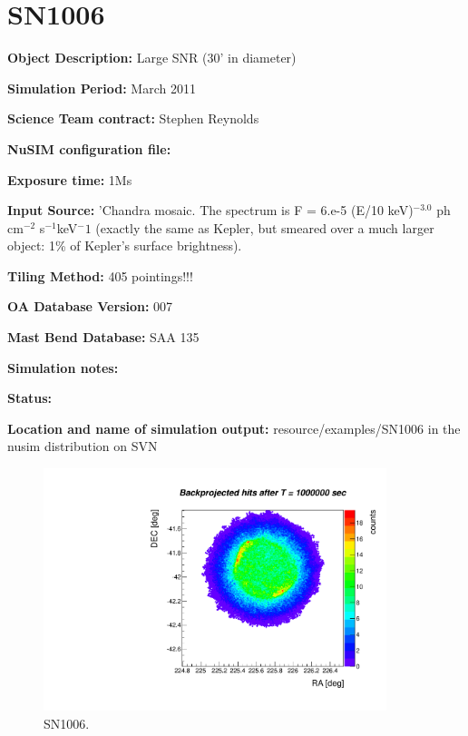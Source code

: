 
\newpage

\section{SN1006}

\textbf{Object Description:} Large SNR (30' in diameter)

\textbf{Simulation Period:}  March 2011

\textbf{Science Team contract:} Stephen Reynolds

\textbf{NuSIM configuration file:}

\textbf{Exposure time:} 1Ms

\textbf{Input Source:} 'Chandra mosaic.  The spectrum 
is F = 6.e-5 (E/10 keV)$^{-3.0}$ ph cm$^{-2}$ s$^{-1}$keV${^-1}$ (exactly the same as Kepler, but smeared over a much larger
object: 1\% of Kepler's surface brightness).

\textbf{Tiling Method:} 405 pointings!!!

\textbf{OA Database Version:} 007

\textbf{Mast Bend Database:} SAA 135

\textbf{Simulation notes:} 

\textbf{Status:} 

\textbf{Location and name of simulation output:} resource/examples/SN1006 in the nusim distribution on SVN

\begin{figure}[h]
\begin{center}
\includegraphics[width=10cm]{SN1006/sn1006.pdf}  %
\caption{SN1006.}
\label{sn1006} 
\end{center}
\end{figure}

